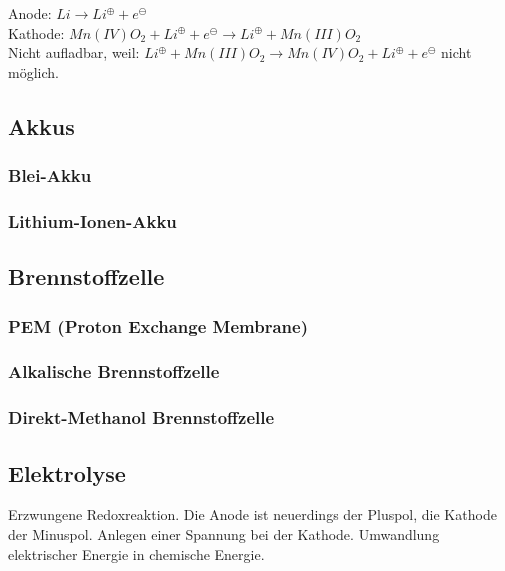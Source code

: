 Anode: $Li \rightarrow Li^\oplus + e^\ominus$\\

Kathode: $Mn(IV)O_2 + Li^\oplus + e^\ominus \rightarrow Li^\oplus + Mn(III)O_2$\\

Nicht aufladbar, weil: $Li^\oplus + Mn(III)O_2 \rightarrow Mn(IV)O_2 + Li^\oplus + e^\ominus$ nicht möglich.

\subsection{Akkus}


\subsubsection{Blei-Akku}

\subsubsection{Lithium-Ionen-Akku}


\subsection{Brennstoffzelle}


\subsubsection{PEM (Proton Exchange Membrane)}

\subsubsection{Alkalische Brennstoffzelle}

\subsubsection{Direkt-Methanol Brennstoffzelle}


\subsection{Elektrolyse}

Erzwungene Redoxreaktion. Die Anode ist neuerdings der Pluspol, die Kathode der Minuspol. Anlegen einer Spannung bei der Kathode. Umwandlung elektrischer Energie in chemische Energie.

